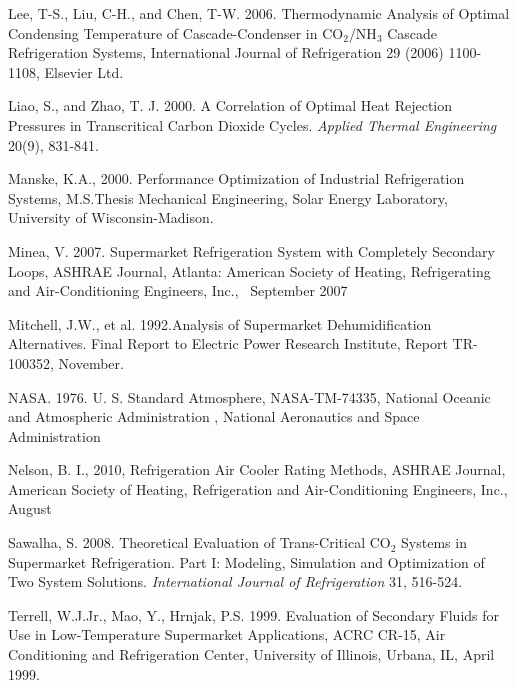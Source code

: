 Lee, T-S., Liu, C-H., and Chen, T-W. 2006. Thermodynamic Analysis of Optimal Condensing Temperature of Cascade-Condenser in CO\(_{2}\)/NH\(_{3}\) Cascade Refrigeration Systems, International Journal of Refrigeration 29 (2006) 1100-1108, Elsevier Ltd.

Liao, S., and Zhao, T. J. 2000. A Correlation of Optimal Heat Rejection Pressures in Transcritical Carbon Dioxide Cycles. \emph{Applied Thermal Engineering} 20(9), 831-841.

Manske, K.A., 2000. Performance Optimization of Industrial Refrigeration Systems, M.S.Thesis Mechanical Engineering, Solar Energy Laboratory, University of Wisconsin-Madison.

Minea, V. 2007. Supermarket Refrigeration System with Completely Secondary Loops, ASHRAE Journal, Atlanta: American Society of Heating, Refrigerating and Air-Conditioning Engineers, Inc., ~September 2007

Mitchell, J.W., et al. 1992.Analysis of Supermarket Dehumidification Alternatives. Final Report to Electric Power Research Institute, Report TR-100352, November.

NASA. 1976. U. S. Standard Atmosphere, NASA-TM-74335, National Oceanic and Atmospheric Administration , National Aeronautics and Space Administration

Nelson, B. I., 2010, Refrigeration Air Cooler Rating Methods, ASHRAE Journal, American Society of Heating, Refrigeration and Air-Conditioning Engineers, Inc., August

Sawalha, S. 2008. Theoretical Evaluation of Trans-Critical CO\(_{2}\) Systems in Supermarket Refrigeration. Part I: Modeling, Simulation and Optimization of Two System Solutions. \emph{International Journal of Refrigeration} 31, 516-524.

Terrell, W.J.Jr., Mao, Y., Hrnjak, P.S. 1999. Evaluation of Secondary Fluids for Use in Low-Temperature Supermarket Applications, ACRC CR-15, Air Conditioning and Refrigeration Center, University of Illinois, Urbana, IL, April 1999.
